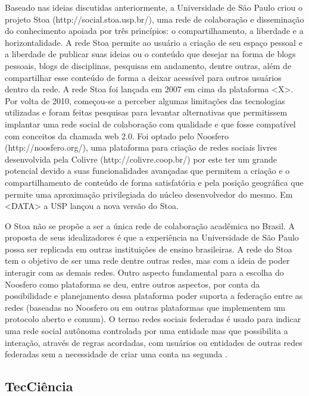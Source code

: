 Baseado nas ideias discutidas anteriormente, a Universidade de São Paulo criou o
projeto Stoa (http://social.stoa.usp.br/), uma rede de colaboração e disseminação
do conhecimento apoiada por três princípios: o compartilhamento, a liberdade e a
horizontalidade. A rede Stoa permite ao usuário a criação de seu espaço pessoal
e a  liberdade de publicar suas ideias ou o conteúdo que desejar na forma de
blogs pessoais, blogs de disciplinas, pesquisas em andamento, dentre outras,
além de compartilhar esse conteúdo de forma a deixar acessível para outros
usuários dentro da rede. A rede Stoa foi lançada em 2007
em cima da plataforma <X>. Por volta de 2010, começou-se a perceber algumas
limitações das tecnologias utilizadas e foram feitas pesquisas para levantar
alternativas que permitissem implantar uma rede social de colaboração com
qualidade e que fosse compatível com conceitos da chamada web 2.0. Foi optado
pelo Noosfero (http://noosfero.org/), uma plataforma para criação de redes sociais
livres desenvolvida pela Colivre (http://colivre.coop.br/) por este ter um grande
potencial devido a suas funcionalidades avançadas que permitem a criação e o
compartilhamento de conteúdo de forma satisfatória e pela posição geográfica que
permite uma aproximação privilegiada do núcleo desenvolvedor do mesmo. Em <DATA>
a USP lançou a nova versão do Stoa.

O Stoa não se propõe a ser a única rede de colaboração acadêmica no Brasil. A
proposta de seus idealizadores é que a experiência na Universidade de São Paulo
possa ser replicada em outras instituições de ensino brasileiras. A rede do Stoa
tem o objetivo de ser uma rede dentre outras redes, mas com a ideia de poder
interagir com as demais redes. Outro aspecto fundamental para a escolha do Noosfero
como plataforma se deu, entre outros aspectos, por conta da possibilidade e
planejamento dessa plataforma poder suporta a federação entre as redes (baseadas
no Noosfero ou em outras plataformas que implementem um protocolo aberto e comum).
O termo redes sociais federadas é usado para indicar uma rede social autônoma
controlada por uma entidade mas que possibilita a interação, através de regras
acordadas, com usuários ou entidades de outras redes federadas sem a necessidade
de criar uma conta na segunda \cite{heckert2010}.

\subsection{TecCiência}

